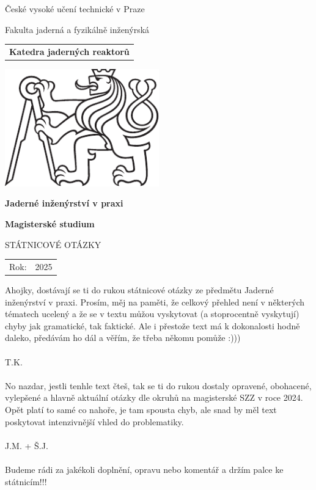\documentclass[a4paper, 11pt]{article}
\newcommand{\logoCVUT}{\includegraphics[width = 0.5\textwidth]{img/symbol_cvut_konturova_verze_cb.pdf}}
\begin{document}
% 
% 

\thispagestyle{empty}

\begin{center}
	{\LARGE
		České vysoké učení technické v Praze \par
		Fakulta jaderná a fyzikálně inženýrská
	}
    \vspace{10mm}

    \begin{tabular}{c}
		\textbf{Katedra jaderných reaktorů} \\[3pt]
    \end{tabular}

   \vspace{10mm} \logoCVUT \vspace{15mm}

   {\huge \textbf{Jaderné inženýrství v praxi}\par}
   \vspace{5mm}
   {\huge \textbf{Magisterské studium}\par}

   \vspace{15mm}
   {\Large \MakeUppercase{Státnicové otázky}}

   \vfill
   {\large
    \begin{tabular}{ll}
    Rok: & 2025
    \end{tabular}
   }
\end{center}

\newpage
\thispagestyle{empty}

\vfill

\vspace{1em}

Ahojky, dostávají se ti do rukou státnicové otázky ze předmětu Jaderné inženýrství v praxi. Prosím, měj na paměti, že celkový přehled není v některých tématech ucelený a že se v textu můžou vyskytovat (a stoprocentně vyskytují) chyby jak gramatické, tak faktické. Ale i přestože text má k dokonalosti hodně daleko, předávám ho dál a věřím, že třeba někomu pomůže :)))\\
\\
T.K.\\
\\
No nazdar, jestli tenhle text čteš, tak se ti do rukou dostaly opravené, obohacené, vylepšené a hlavně aktuální otázky dle okruhů na magisterské SZZ v roce 2024. Opět platí to samé co nahoře, je tam spousta chyb, ale snad by měl text poskytovat intenzivnější vhled do problematiky.\\
\\
J.M. + Š.J.\\
\\
Budeme rádi za jakékoli doplnění, opravu nebo komentář a držím palce ke státnicím!!!
\end{document}
